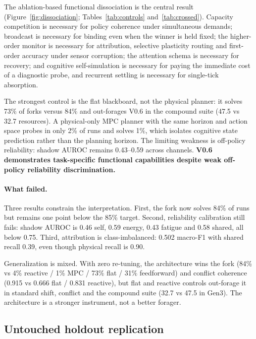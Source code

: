 \documentclass[11pt,a4paper]{article}
\begin{document}
The ablation-based functional dissociation is the central result (Figure~\ref{fig:dissociation}; Tables~\ref{tab:controls} and~\ref{tab:crossed}). Capacity competition is necessary for policy
coherence under simultaneous demands; broadcast is necessary for binding even when the winner is
held fixed; the higher-order monitor is necessary for attribution, selective plasticity routing and
first-order accuracy under sensor corruption; the attention schema is necessary for recovery; and
cognitive self-simulation is necessary for paying the immediate cost of a diagnostic probe, and
recurrent settling is necessary for single-tick absorption.

The strongest control is the flat blackboard, not the physical planner: it solves 73\% of forks
versus 84\% and out-forages V0.6 in the compound suite (47.5 vs 32.7 resources). A physical-only MPC
planner with the same horizon and action space probes in only 2\% of runs and solves 1\%, which
isolates cognitive state prediction rather than the planning horizon. The limiting weakness is
off-policy reliability: shadow AUROC remains 0.43--0.59 across channels. \textbf{V0.6 demonstrates
task-specific functional capabilities despite weak off-policy reliability discrimination.}

\paragraph{What failed.}
Three results constrain the interpretation. First, the fork now solves 84\% of runs but remains
one point below the 85\% target. Second, reliability calibration still fails: shadow AUROC is 0.46
self, 0.59 energy, 0.43 fatigue and 0.58 shared, all below 0.75. Third, attribution is
class-imbalanced: 0.502 macro-F1 with shared recall 0.39, even though physical recall is 0.90.

Generalization is mixed. With zero re-tuning, the architecture wins the fork (84\% vs 4\%
reactive / 1\% MPC / 73\% flat / 31\% feedforward) and conflict coherence (0.915 vs 0.666
flat / 0.831 reactive), but flat and reactive controls out-forage it in standard shift, conflict
and the compound suite (32.7 vs 47.5 in Gen3). The architecture is a stronger instrument, not a
better forager.

\subsection{Untouched holdout replication}
\end{document}
